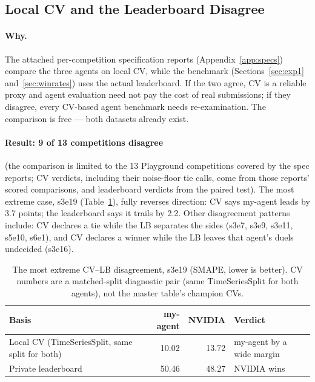 \documentclass[11pt,a4paper]{article}
\begin{document}
\subsection{Local CV and the Leaderboard Disagree}
\label{sec:exp3}

\paragraph{Why.} The attached per-competition specification reports (Appendix~\ref{app:specs}) compare the three agents on local CV, while the benchmark (Sections~\ref{sec:exp1} and~\ref{sec:winrates}) uses the actual leaderboard. If the two agree, CV is a reliable proxy and agent evaluation need not pay the cost of real submissions; if they disagree, every CV-based agent benchmark needs re-examination. The comparison is free --- both datasets already exist.

\paragraph{Result: 9 of 13 competitions disagree} (the comparison is limited to the 13 Playground competitions covered by the spec reports; CV verdicts, including their noise-floor tie calls, come from those reports' scored comparisons, and leaderboard verdicts from the paired test). The most extreme case, s3e19 (Table~\ref{tab:cvlb}), fully reverses direction: CV says my-agent leads by 3.7 points; the leaderboard says it trails by 2.2. Other disagreement patterns include: CV declares a tie while the LB separates the sides (s3e7, s3e9, s3e11, s5e10, s6e1), and CV declares a winner while the LB leaves that agent's duels undecided (s3e16).

\begin{table}[htbp]
\centering\small
\caption{The most extreme CV--LB disagreement, s3e19 (SMAPE, lower is better). CV numbers are a matched-split diagnostic pair (same TimeSeriesSplit for both agents), not the master table's champion CVs.}
\label{tab:cvlb}
\begin{tabular}{@{}lrrl@{}}
\toprule
\textbf{Basis} & \textbf{my-agent} & \textbf{NVIDIA} & \textbf{Verdict} \\
\midrule
Local CV (TimeSeriesSplit, same split for both) & 10.02 & 13.72 & my-agent by a wide margin \\
Private leaderboard & 50.46 & 48.27 & NVIDIA wins \\
\bottomrule
\end{tabular}
\end{table}
\end{document}

